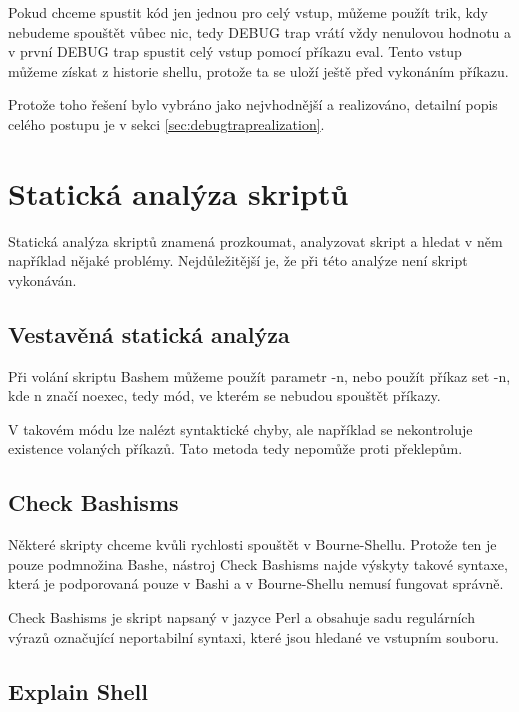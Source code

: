\documentclass[thesis=M,czech]{FITthesis}[2012/06/26]
\begin{document}
Pokud chceme spustit kód jen jednou pro celý vstup, můžeme použít trik, kdy nebudeme spouštět vůbec nic, tedy DEBUG trap vrátí vždy nenulovou hodnotu a v první DEBUG trap spustit celý vstup pomocí příkazu eval. Tento vstup můžeme získat z historie shellu, protože ta se uloží ještě před vykonáním příkazu.

Protože toho řešení bylo vybráno jako nejvhodnější a realizováno, detailní popis celého postupu je v sekci \ref{sec:debugtraprealization}.




\section{Statická analýza skriptů}

Statická analýza skriptů znamená prozkoumat, analyzovat skript a hledat v něm například nějaké problémy. Nejdůležitější je, že při této analýze není skript vykonáván.


%
%
\subsection{Vestavěná statická analýza}

Při volání skriptu Bashem můžeme použít parametr -n, nebo použít příkaz set -n, kde n značí noexec, tedy mód, ve kterém se nebudou spouštět příkazy.

V takovém módu lze nalézt syntaktické chyby, ale například se nekontroluje existence volaných příkazů. Tato metoda  tedy nepomůže proti překlepům.


%
%
\subsection{Check Bashisms}

Některé skripty chceme kvůli rychlosti spouštět v Bourne-Shellu. Protože ten je pouze podmnožina Bashe, nástroj Check Bashisms najde výskyty takové syntaxe, která je podporovaná pouze v Bashi a v Bourne-Shellu nemusí fungovat správně.

Check Bashisms je skript napsaný v jazyce Perl a obsahuje sadu regulárních výrazů označující neportabilní syntaxi, které jsou hledané ve vstupním souboru.



%
%
\subsection{Explain Shell}
\end{document}
